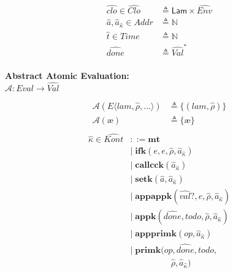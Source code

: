 \documentclass[12pt,draft]{article}
\newcommand\mae{\ensuremath{\text{\ae}}}
\begin{document}
\begin{multicols*}{2}
\begin{align*}
    \widehat{clo} \in \widehat{\textit{Clo}}
    &\triangleq \textsf{Lam} \times \widehat{\textit{Env}} \\
    \hat{a},\hat{a}_{\hat{\kappa}} \in \textit{Addr} &\triangleq \mathbb{N} \\
    \hat{t} \in \textit{Time} &\triangleq \mathbb{N} \\
    \widehat{done} &\triangleq \widehat{\textit{Val}}^* \\
  \end{align*}
  \begin{center}
    \textbf{Abstract Atomic Evaluation:} \\
    $\mathcal{A} : \textit{Eval} \rightarrow \widehat{\textit{Val}}$
  \end{center}
  \vspace{-7mm}
  \begin{align*}
    \mathcal{A}(E\langle lam , \hat{\rho} , ... \rangle)
    &\triangleq \{ (lam , \hat{\rho}) \} \\
    \mathcal{A}(\mae)
    &\triangleq \{\mae\} \\
  \end{align*}
  \vfill\null
  \columnbreak
  \begin{align*}
    \hat{\kappa} \in \widehat{\textit{Kont}} &::= \textbf{mt} \\
    &|\; \textbf{ifk}(e, e, \hat{\rho}, \hat{a}_{\hat{\kappa}}) \\
    &|\; \textbf{callcck}(\hat{a}_{\hat\kappa}) \\
    &|\; \textbf{setk}(\hat{a}, \hat{a}_{\hat{\kappa}}) \\
    &|\; \textbf{appappk}(\widehat{val}?, e, \hat{\rho}, \hat{a}_{\hat\kappa}) \\
    &|\; \textbf{appk}(\widehat{done}, todo, \hat{\rho}, \hat{a}_{\hat\kappa}) \\
    &|\; \textbf{appprimk}(op, \hat{a}_{\hat\kappa}) \\
    &|\; \textbf{primk}(op, \widehat{done}, todo, \\
    &\;\;\;\;\;\;\;\;\;\;\;\;\;\;\;\;\;\hat{\rho}, \hat{a}_{\hat\kappa}) \\

\end{align*}
\end{multicols*}
\end{document}
